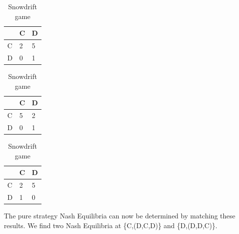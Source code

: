 \documentclass[a4paper, 11pt]{article}
\begin{document}
\begin{table}[!htb]
    \begin{minipage}{.33\linewidth}
      \caption{Prisonners dilemma}
      \label{table-PrisonnersDilemmaPayoffB}
      \centering
\begin{tabular}{l|l|l|}
\cline{2-3}
                        & C & D                         \\ \hline
\multicolumn{1}{|l|}{C} & 2 & \cellcolor[HTML]{9AFF99}5 \\ \hline
\multicolumn{1}{|l|}{D} & 0 & \cellcolor[HTML]{9AFF99}1 \\ \hline
\end{tabular}
    \end{minipage}%
    \begin{minipage}{.33\linewidth}
      \centering
      \caption{Stag-Hunt game}
      \label{table-Stag-HuntPayoffB}
\begin{tabular}{l|l|l|}
\cline{2-3}
                        & C                         & D                         \\ \hline
\multicolumn{1}{|l|}{C} & \cellcolor[HTML]{9AFF99}5 & 2                         \\ \hline
\multicolumn{1}{|l|}{D} & 0                         & \cellcolor[HTML]{9AFF99}1 \\ \hline
\end{tabular}
    \end{minipage} 
    \begin{minipage}{.33\linewidth}
      \centering
        \caption{Snowdrift game}
        \label{table-SnowdriftGamePayoffB}
\begin{tabular}{l|l|l|}
\cline{2-3}
                        & C                         & D                         \\ \hline
\multicolumn{1}{|l|}{C} & 2                         & \cellcolor[HTML]{9AFF99}5 \\ \hline
\multicolumn{1}{|l|}{D} & \cellcolor[HTML]{9AFF99}1 & 0                         \\ \hline
\end{tabular}
    \end{minipage} 
\end{table}


The pure strategy Nash Equilibria can now be determined by matching these results. We find two Nash Equilibria at \{C,(D,C,D)\} and \{D,(D,D,C)\}.
\end{document}
